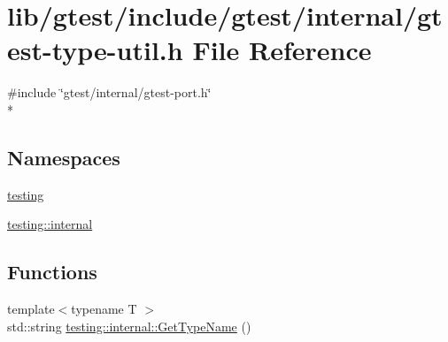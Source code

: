\hypertarget{gtest-type-util_8h}{\section{lib/gtest/include/gtest/internal/gtest-\/type-\/util.h File Reference}
\label{gtest-type-util_8h}
}
{\ttfamily \#include \char`\"{}gtest/internal/gtest-\/port.\-h\char`\"{}}\\*
\subsection*{Namespaces}
\begin{DoxyCompactItemize}
\item 
\hyperlink{namespacetesting}{testing}
\item 
\hyperlink{namespacetesting_1_1internal}{testing\-::internal}
\end{DoxyCompactItemize}
\subsection*{Functions}
\begin{DoxyCompactItemize}
\item 
{\footnotesize template$<$typename T $>$ }\\std\-::string \hyperlink{namespacetesting_1_1internal_a635606b4731f843c86ec8ca51cab83a1}{testing\-::internal\-::\-Get\-Type\-Name} ()
\end{DoxyCompactItemize}
